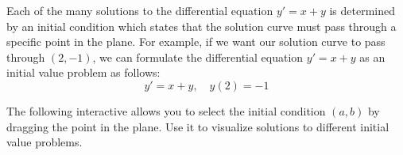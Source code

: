 \documentclass{ximera}
\begin{document}
  
  
 
Each of the many solutions to the differential equation $y'=x+y$ is determined by an initial condition which states that the solution curve must pass through a specific point in the plane.  For example, if we want our solution curve to pass through $(2,-1)$, we can formulate the differential equation $y'=x+y$ as an initial value problem as follows:
$$y'=x+y,\quad y(2)=-1$$

The following interactive allows you to select the initial condition $(a, b)$ by dragging the point in the plane.  Use it to visualize solutions to different initial value problems.  

\begin{center}  
\end{center}

 
 
\end{document}
